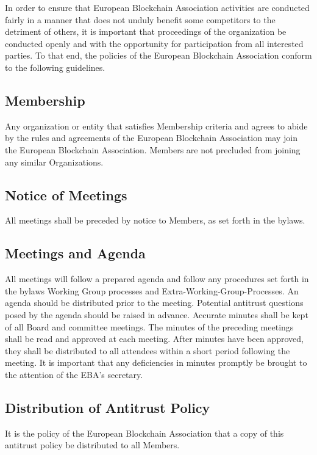 \documentclass{article}
\begin{document}
In order to ensure that European Blockchain Association activities are conducted fairly in a manner that does not unduly benefit some competitors to the detriment of others, it is important that proceedings of the organization be conducted openly and with the opportunity for participation from all interested parties. 
To that end, the policies of the European Blockchain Association conform to the following guidelines.

\subsection{Membership}

Any organization or entity that satisfies Membership criteria and agrees to abide by the rules and agreements of the European Blockchain Association may join the European Blockchain Association. 
Members are not precluded from joining any similar Organizations.

\subsection{Notice of Meetings}

All meetings shall be preceded by notice to Members, as set forth in the bylaws.

\subsection{Meetings and Agenda}

All meetings will follow a prepared agenda and follow any procedures set forth in the bylaws Working Group processes and Extra-Working-Group-Processes. 
An agenda should be distributed prior to the meeting.
 Potential antitrust questions posed by the agenda should be raised in advance. 
 Accurate minutes shall be kept of all Board and committee meetings. 
 The minutes of the preceding meetings shall be read and approved at each meeting. 
 After minutes have been approved, they shall be distributed to all attendees within a short period following the meeting.
  It is important that any deficiencies in minutes promptly be brought to the attention of the EBA’s secretary.

\subsection{Distribution of Antitrust Policy}

It is the policy of the European Blockchain Association that a copy of this antitrust policy be distributed to all Members.
\end{document}
